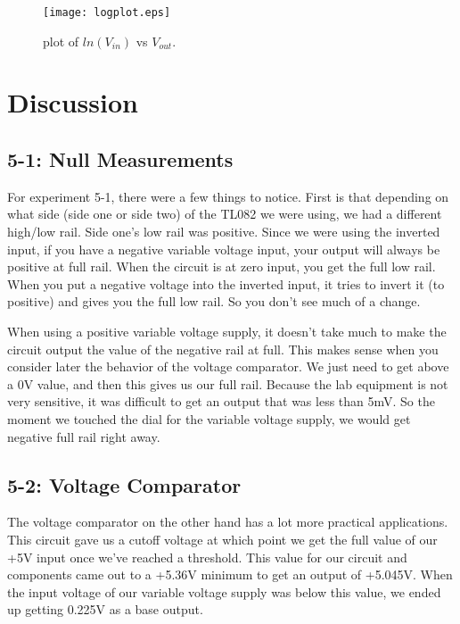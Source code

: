 \documentclass[%
 aip,
 jmp,
 amsmath,
 amssymb,
 reprint,%
 numerical,
 longbibliography,
]{revtex4-1}
\begin{document}
	\begin{figure}[H]
	\texttt{[image: logplot.eps]}
	\caption{\label{logplot}plot of $ln(V_{in})$ vs $V_{out}$.}
	\end{figure}
	

\section{Discussion} \label{Section:Discussion}

	\subsection{5-1: Null Measurements}
	
	For experiment 5-1, there were a few things to notice. First is that depending on what side (side one or side two) of the TL082 we 
	were using, we had a different high/low rail. Side one's low rail was positive. Since we were using the inverted input, if you have a
	negative variable voltage input, your output will always be positive at full rail. When the circuit is at zero input, you get the full
	low rail. When you put a negative voltage into the inverted input, it tries to invert it (to positive) and gives you the full low rail.
	So you don't see much of a change.
	
	When using a positive variable voltage supply, it doesn't take much to make the circuit output the value of the negative rail at full. This
	makes sense when you consider later the behavior of the voltage comparator. We just need to get above a 0V value, and then this gives us our
	full rail. Because the lab equipment is not very sensitive, it was difficult to get an output that was less than 5mV. So the moment we touched
	the dial for the variable voltage supply, we would get negative full rail right away. 
	
	\subsection{5-2: Voltage Comparator}
	
	The voltage comparator on the other hand has a lot more practical applications. This circuit gave us a cutoff voltage at which point we get
	the full value of our +5V input once we've reached a threshold. This value for our circuit and components came out to a +5.36V minimum to get
	an output of +5.045V. When the input voltage of our variable voltage supply was below this value, we ended up getting 0.225V as a base output.
	
\end{document}
